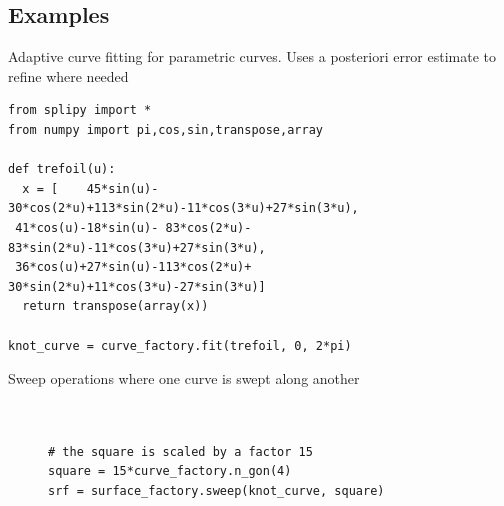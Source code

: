 \documentclass[landscape]{sintefposter}
\begin{document}
\begin{multicols}{3}
\vspace{-.5cm}
\section{Examples}

Adaptive curve fitting for parametric curves.
Uses a posteriori error estimate to refine where needed
\begin{tcolorbox}[colback=sinteflightgrey]
  \begin{Verbatim}[fontsize=\footnotesize]
from splipy import *
from numpy import pi,cos,sin,transpose,array

def trefoil(u):
  x = [    45*sin(u)- 30*cos(2*u)+113*sin(2*u)-11*cos(3*u)+27*sin(3*u),
 41*cos(u)-18*sin(u)- 83*cos(2*u)- 83*sin(2*u)-11*cos(3*u)+27*sin(3*u),
 36*cos(u)+27*sin(u)-113*cos(2*u)+ 30*sin(2*u)+11*cos(3*u)-27*sin(3*u)]
  return transpose(array(x))

knot_curve = curve_factory.fit(trefoil, 0, 2*pi)
  \end{Verbatim}
\end{tcolorbox}

Sweep operations where one curve is swept along another

\vspace{1cm}

\begin{figure}[h!]
  \begin{minipage}[b]{0.65\linewidth}
    \begin{tcolorbox}[colback=sinteflightgrey]
      \begin{Verbatim}[fontsize=\footnotesize]


# the square is scaled by a factor 15
square = 15*curve_factory.n_gon(4)
srf = surface_factory.sweep(knot_curve, square)




\end{Verbatim}
\end{tcolorbox}
\end{minipage}
\end{figure}
\end{multicols}
\end{document}
